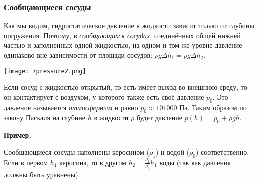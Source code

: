 \documentclass[12pt, a4paper]{article}%
\begin{document}
\subsubsection*{Сообщающиеся сосуды}

Как мы видим, гидростатическое давление в жидкости зависит только от глубины погружения. Поэтому, в \textit{сообщающихся сосудах}, соединённых общей нижней частью и заполненных одной жидкостью, на одном и том же уровне давление одинаково вне зависимости от площади сосудов: $\rho g \Delta h_1 = \rho g \Delta h_2$.


\begin{center}
\texttt{[image: 7pressure2.png]}
\label{fig:mpr}
\end{center}



Если сосуд с жидкостью открытый, то есть имеет выход во внешнюю среду, то он контактирует с воздухом, у которого также есть своё давление $p_0$.
Это давление называется \textit{атмосферным} и равно $p_0 \approx 101000$ Па. Таким образом по закону Паскаля на глубине $h$ в жидкости $\rho$ будет давление $p(h) = p_0+\rho gh$.


\textbf{Пример.} 

Сообщающиеся сосуды наполнены керосином ($\rho_1$) и водой ($\rho_0$) соответственно. Если в первом $h_1$ керосина, то в другом $h_2 = \frac{\rho_1}{\rho_0}h_1$ воды (так как давления должны быть уравнены).  
\end{document}
